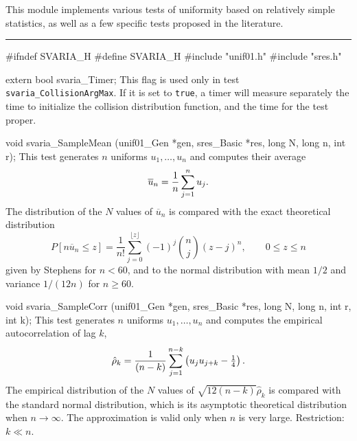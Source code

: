 
This module implements various tests of uniformity based on
relatively simple statistics, as well as a few specific tests proposed
in the literature. \resdef


\bigskip
\hrule
\code\hide
#ifndef SVARIA_H
#define SVARIA_H
\endhide
#include "unif01.h"
#include "sres.h"
\endcode

\ifdetailed  %
\code


extern bool svaria_Timer;
\endcode
 \tab
   This flag is used only in test  {\tt svaria\_CollisionArgMax}.
   If it is set to {\tt true}, a timer will measure separately the time to
   initialize the collision distribution function, and the time for the
   test proper.
 \endtab

\fi   %


\code

void svaria_SampleMean (unif01_Gen *gen, sres_Basic *res,
                        long N, long n, int r);
\endcode
 \tab
   This test generates $n$ uniforms $u_1,\dots,u_n$ and computes
   their average
    $$ \overline u_n = {1\over n} \sum_{j=1}^n u_j.$$
   The distribution of the $N$ values of $\overline u_n$ is compared
   with the exact theoretical distribution
$$
   P[n \overline u_n \le z] = \frac 1 {n!}
      \sum_{j = 0}^{\lfloor z \rfloor} (-1)^j {n \choose j} (z - j)^n,
     \qquad 0 \le z \le n
$$
   given by Stephens \cite{tSTE66a}
   for $n < 60$, and to the normal distribution with mean $1/2$
   and variance $1/(12n)$ for $n\ge 60$.
 \endtab
\code


void svaria_SampleCorr (unif01_Gen *gen, sres_Basic *res,
                        long N, long n, int r, int k);
\endcode
 \tab
  This test generates $n$ uniforms $u_1,\dots,u_n$ and
   computes 
  the empirical autocorrelation \cite{sFIS78a} of lag $k$,
    $$
     \hat\rho_k = {1 \over (n-k)} \sum_{j=1}^{n-k}
               \left(u_j u_{j+k} - {\textstyle \frac14}\right).
    $$
   The empirical distribution
   of the $N$ values of $\sqrt{12 (n-k)} \hat\rho_k$
   is compared with the standard normal distribution,
   which is its asymptotic theoretical distribution when $n \to\infty$.
   The approximation is valid only when $n$ is very large.
   Restriction: $k \ll n$.
 \endtab
\code


